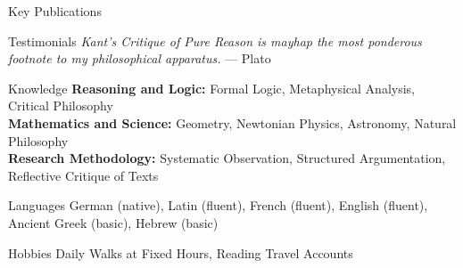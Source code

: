 \begin{hpxcv}
\begin{hpxmaincol}
        \begin{hpxmaincolsection}{Key Publications}
            \begin{dateentry}[
                    from={1781},
                    to={},
                    title={Critique of Pure Reason},
                    institution={},
                ]
                \kant[6][1]
            \end{dateentry}
            \begin{dateentry}[
                    from={1788},
                    to={},
                    title={Critique of Practical Reason},
                    institution={},
                ]
                \kant[6][2]
            \end{dateentry}
            \begin{dateentry}[
                    from={1790},
                    to={},
                    title={Critique of the Power of Judgement},
                    institution={},
                ]
                \kant[6][3]
            \end{dateentry}
        \end{hpxmaincolsection}
        \begin{hpxmaincolsection}{Testimonials}
            {\itshape
                Kant’s Critique of Pure Reason is mayhap the most ponderous footnote to my philosophical apparatus.%
            } \hfill--- Plato\\[1ex]
        \end{hpxmaincolsection}
    \end{hpxmaincol}
    \begin{hpxsidecol}
        \begin{sideentry}{Knowledge}
            \textbf{Reasoning and Logic:} Formal Logic, Metaphysical Analysis, Critical Philosophy\\[1ex]
            \textbf{Mathematics and Science:} Geometry, Newtonian Physics, Astronomy, Natural Philosophy\\[1ex]
            \textbf{Research Methodology:} Systematic Observation, Structured Argumentation, Reflective Critique of Texts\\[1ex]
        \end{sideentry}

        \begin{sideentry}{Languages}
            German (native), Latin (fluent), French (fluent), English (fluent), Ancient Greek (basic), Hebrew (basic)
        \end{sideentry}

        \begin{sideentry}{Hobbies}
            Daily Walks at Fixed Hours, Reading Travel Accounts
        \end{sideentry}
    \end{hpxsidecol}
\end{hpxcv}

